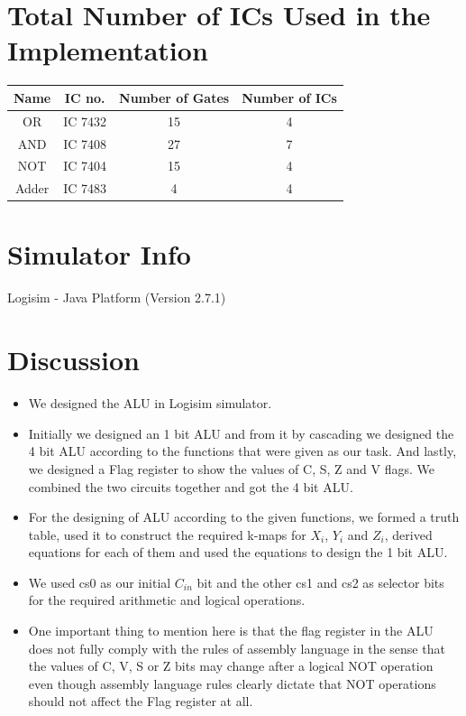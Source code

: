 \documentclass[a4paper]{article}
\begin{document}
\section{Total Number of ICs Used in the Implementation}

\begin{table}[ht]
\centering
\begin{tabular}{|c|c|c|c|}
    \hline
    \textbf{Name} & \textbf{IC no.} & \textbf{Number of Gates} & \textbf{Number of ICs} \\
    \hline
    OR & IC 7432 & 15 & 4 \\
    \hline
    AND & IC 7408 & 27 & 7 \\
    \hline
    NOT & IC 7404 & 15 & 4 \\
    \hline
    Adder & IC 7483 & 4 & 4 \\
    \hline
\end{tabular}
\end{table}

\newpage
\section{Simulator Info}
Logisim - Java Platform (Version 2.7.1)

\section{Discussion}
\begin{itemize}
  \item We designed the ALU in Logisim simulator.
  \item Initially we designed an 1 bit ALU and from it by cascading we designed the 4 bit ALU according to the functions that were given as our task. And lastly, we designed a Flag register to show the values of C, S, Z and V flags. We combined the two circuits together and got the 4 bit ALU. 
  \item For the designing of ALU according to the given functions, we formed a truth table, used it to construct the required k-maps for $X_i$, $Y_i$ and $Z_i$, derived equations for each of them and used the equations to design the 1 bit ALU.
  \item  We used cs0 as our initial $C_{in}$ bit and the other cs1 and cs2 as selector bits for the required arithmetic and logical operations.
  \item One important thing to mention here is that the flag register in the ALU does not fully comply with the rules of assembly language in the sense that the values of C, V, S or Z bits may change after a logical NOT operation even though assembly language rules clearly dictate that NOT operations should not affect the Flag register at all.
\end{itemize}
\end{document}
